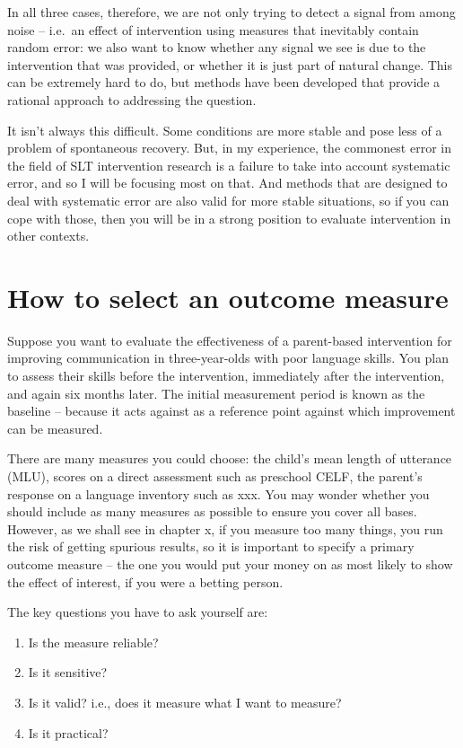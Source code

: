 \documentclass[]{book}
\providecommand{\tightlist}{%
  \setlength{\itemsep}{0pt}\setlength{\parskip}{0pt}}
\begin{document}
In all three cases, therefore, we are not only trying to detect a signal from among noise -- i.e.~an effect of intervention using measures that inevitably contain random error: we also want to know whether any signal we see is due to the intervention that was provided, or whether it is just part of natural change. This can be extremely hard to do, but methods have been developed that provide a rational approach to addressing the question.

It isn't always this difficult. Some conditions are more stable and pose less of a problem of spontaneous recovery. But, in my experience, the commonest error in the field of SLT intervention research is a failure to take into account systematic error, and so I will be focusing most on that. And methods that are designed to deal with systematic error are also valid for more stable situations, so if you can cope with those, then you will be in a strong position to evaluate intervention in other contexts.

\hypertarget{how-to-select-an-outcome-measure}{%
\chapter{How to select an outcome measure}\label{how-to-select-an-outcome-measure}}

Suppose you want to evaluate the effectiveness of a parent-based intervention for improving communication in three-year-olds with poor language skills. You plan to assess their skills before the intervention, immediately after the intervention, and again six months later. The initial measurement period is known as the baseline -- because it acts against as a reference point against which improvement can be measured.

There are many measures you could choose: the child's mean length of utterance (MLU), scores on a direct assessment such as preschool CELF, the parent's response on a language inventory such as xxx. You may wonder whether you should include as many measures as possible to ensure you cover all bases. However, as we shall see in chapter x, if you measure too many things, you run the risk of getting spurious results, so it is important to specify a primary outcome measure -- the one you would put your money on as most likely to show the effect of interest, if you were a betting person.

The key questions you have to ask yourself are:

\begin{enumerate}
\def\labelenumi{\arabic{enumi}.}
\tightlist
\item
  Is the measure reliable?
\item
  Is it sensitive?
\item
  Is it valid? i.e., does it measure what I want to measure?
\item
  Is it practical?
\end{enumerate}
\end{document}
